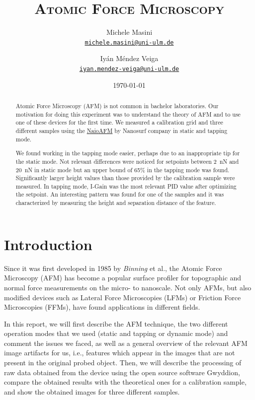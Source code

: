 \documentclass[11pt,a4paper]{article}
\title{\bfseries\textsc{Atomic Force Microscopy}}
\author{
Michele Masini\\ \small\texttt{\href{mailto:michele.masini@uni-ulm.de}{michele.masini@uni-ulm.de}}\and
Iyán Méndez Veiga\\ \small\texttt{\href{mailto:iyan.mendez-veiga@uni-ulm.de}{iyan.mendez-veiga@uni-ulm.de}}
}
\date{\today}
\begin{document}
\maketitle

\begin{abstract}
Atomic Force Microscopy (AFM) is not common in bachelor laboratories. Our motivation for doing this experiment was to understand the theory of AFM and to use one of these devices for the first time. We measured a calibration grid and three different samples using the \href{https://www.nanosurf.com/en/products/naioafm-the-leading-compact-afm}{NaioAFM} by Nanosurf company in static and tapping mode.

We found working in the tapping mode easier, perhaps due to an inappropriate tip for the static mode. Not relevant differences were noticed for setpoints between \SI{2}{\nano\N} and \SI{20}{\nano\N} in static mode but an upper bound of 65\% in the tapping mode was found. Significantly larger height values than those provided by the calibration sample were measured.  In tapping mode, I-Gain was the most relevant PID value after optimizing the setpoint. An interesting pattern was found for one of the samples and it was characterized by measuring the height and separation distance of the feature.
\end{abstract}

\vspace{1.5cm}

\section{Introduction}

Since it was first developed in 1985 by \emph{Binning} et al., the Atomic Force Microscopy (AFM) \cite{Bhushan} has become a popular surface profiler for topographic and normal force measurements on the micro- to nanoscale. Not only AFMs, but also modified devices such as Lateral Force Microscopies (LFMs) or Friction Force Microscopies (FFMs), have found applications in different fields.

In this report, we will first describe the AFM technique, the two different operation modes that we used (static and tapping or dynamic mode) and comment the issues we faced, as well as a general overview of the relevant AFM image artifacts for us, i.e., features which appear in the images that are not present in the original probed object. Then, we will describe the processing of raw data obtained from the device using the open source software Gwyddion, compare the obtained results with the theoretical ones for a calibration sample, and show the obtained images for three different samples.
\end{document}
